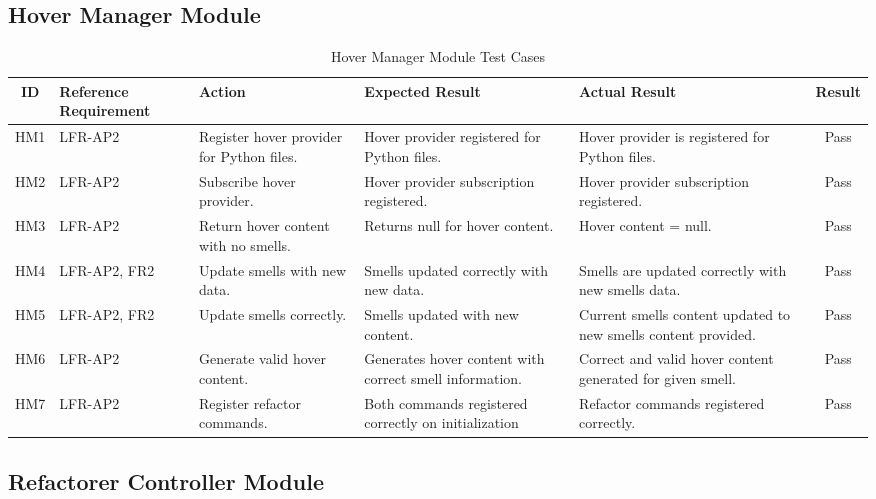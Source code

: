 \documentclass[12pt, titlepage]{article}
\begin{document}
\subsection{Hover Manager Module}
\begin{table}[h!]
\centering
\begin{tabular}{|c|p{2.5cm}|p{3cm}|p{3.5cm}|p{3.5cm}|c|}
\hline
\textbf{ID} & \textbf{Reference Requirement} & \textbf{Action} & \textbf{Expected Result} & \textbf{Actual Result} & \textbf{Result} \\ \hline

HM1 & LFR-AP2 & Register hover provider for Python files. & Hover provider registered for Python files. & Hover provider is registered for Python files. & \cellcolor{green!20} Pass \\ \hline
HM2 & LFR-AP2 & Subscribe hover provider. & Hover provider subscription registered. & Hover provider subscription registered. & \cellcolor{green!20} Pass \\ \hline
HM3 & LFR-AP2 & Return hover content with no smells. & Returns null for hover content. & Hover content = null. & \cellcolor{green!20} Pass \\ \hline
HM4 & LFR-AP2, FR2 & Update smells with new data. & Smells updated correctly with new data. & Smells are updated correctly with new smells data. & \cellcolor{green!20} Pass \\ \hline
HM5 & LFR-AP2, FR2 & Update smells correctly. & Smells updated with new content. & Current smells content updated to new smells content provided.  & \cellcolor{green!20} Pass \\ \hline
HM6 & LFR-AP2 & Generate valid hover content. & Generates hover content with correct smell information. & Correct and valid hover content generated for given smell. & \cellcolor{green!20} Pass \\ \hline
HM7 & LFR-AP2 & Register refactor commands. & Both commands registered correctly on initialization & Refactor commands registered correctly. & \cellcolor{green!20} Pass \\ \hline

\end{tabular}
\caption{Hover Manager Module Test Cases}
\label{table:hover_manager_tests}
\end{table}


\subsection{Refactorer Controller Module}
\end{document}
